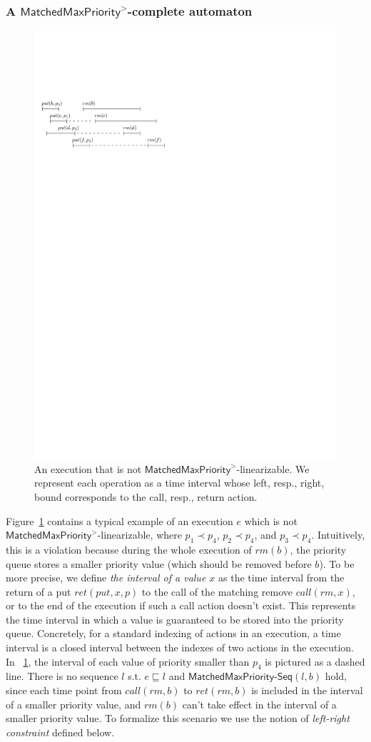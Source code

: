 \subsubsection{A $\mathsf{MatchedMaxPriority}^>$-complete automaton}
\label{subsec:co-regular of EPQ1Lar}

\begin{figure}[t]
  \centering
  \includegraphics[width=0.4 \textwidth]{figures/PIC-HIS-INTRO-GAP-EPQ1L.pdf}
  \caption{An execution that is not $\mathsf{MatchedMaxPriority}^{>}$-linearizable. We represent each operation as a time interval whose left, resp., right, bound corresponds to the call, resp., return action.}
  \label{fig:introduce gap for EPQ1Lar}
\end{figure}






Figure~\ref{fig:introduce gap for EPQ1Lar} contains a typical example of an execution $e$ which is not $\mathsf{MatchedMaxPriority}^>$-linearizable,
where $p_1 \prec p_4$, $p_2 \prec p_4$, and $p_3 \prec p_4$.
Intuitively, this is a violation because during the whole execution of $\textit{rm}(b)$, the priority queue stores a smaller priority value (which should be removed before $b$). To be more precise, we define \emph{the interval of a value $x$} as the time interval from the return of a put $\textit{ret}(\textit{put},x,p)$ to the call of the matching remove $\textit{call}(rm,x)$, or to the end of the execution if such a call action doesn't exist. This represents the time interval in which a value is guaranteed to be stored into the priority queue. Concretely, for a standard indexing of actions in an execution, a time interval is a closed interval between the indexes of two actions in the execution.
In \figurename~\ref{fig:introduce gap for EPQ1Lar}, the interval of each value of priority smaller than $p_4$ is pictured as a dashed line. There is no sequence $l$ s.t. $e \sqsubseteq l$ and $\mathsf{MatchedMaxPriority}\mathsf{\text{-}Seq}(l,b)$ hold, since each time point from $\textit{call}(\textit{rm},b)$ to $\textit{ret}(\textit{rm},b)$ is included in the interval of a smaller priority value,
and $\textit{rm}(b)$ can't take effect in the interval of a smaller priority value.
To formalize this scenario we use the notion of \emph{left-right constraint} defined below.



